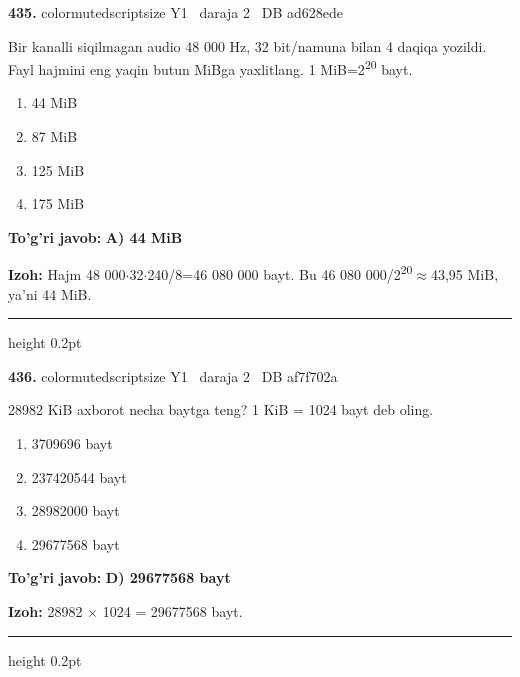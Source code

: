 \documentclass[10pt,a4paper,oneside]{article}
\begin{document}
\noindent\textbf{\color{ink}435.}  {color{muted}scriptsize Y1 \textbullet\ daraja 2 \textbullet\ DB ad628ede}
\par
Bir kanalli siqilmagan audio 48 000 Hz, 32 bit/namuna bilan 4 daqiqa yozildi. Fayl hajmini eng yaqin butun MiBga yaxlitlang. 1 MiB=2\textsuperscript{2}\textsuperscript{0} bayt.
\begin{enumerate}[label=\Alph*),leftmargin=9mm]
\item 44 MiB
\item 87 MiB
\item 125 MiB
\item 175 MiB
\end{enumerate}
\begin{tcolorbox}[enhanced,breakable,colback=teal!4,colframe=teal!50!black,boxrule=0.5pt,arc=1.1mm,left=3mm,right=3mm,top=1.7mm,bottom=1.7mm,before skip=2mm,after skip=2mm]
\textbf{\color{teal}To'g'ri javob:} \textbf{A) 44 MiB}
\par\smallskip
\textbf{Izoh:} Hajm 48 000\ensuremath{\cdot}32\ensuremath{\cdot}240/8=46 080 000 bayt. Bu 46 080 000/2\textsuperscript{2}\textsuperscript{0}\ensuremath{\approx}43,95 MiB, ya'ni 44 MiB.
\end{tcolorbox}
\vspace{2mm}\hrule height 0.2pt \vspace{3mm}

\noindent\textbf{\color{ink}436.}  {color{muted}scriptsize Y1 \textbullet\ daraja 2 \textbullet\ DB af7f702a}
\par
28982 KiB axborot necha baytga teng? 1 KiB = 1024 bayt deb oling.
\begin{enumerate}[label=\Alph*),leftmargin=9mm]
\item 3709696 bayt
\item 237420544 bayt
\item 28982000 bayt
\item 29677568 bayt
\end{enumerate}
\begin{tcolorbox}[enhanced,breakable,colback=teal!4,colframe=teal!50!black,boxrule=0.5pt,arc=1.1mm,left=3mm,right=3mm,top=1.7mm,bottom=1.7mm,before skip=2mm,after skip=2mm]
\textbf{\color{teal}To'g'ri javob:} \textbf{D) 29677568 bayt}
\par\smallskip
\textbf{Izoh:} 28982 \ensuremath{\times} 1024 = 29677568 bayt.
\end{tcolorbox}
\vspace{2mm}\hrule height 0.2pt \vspace{3mm}
\end{document}
